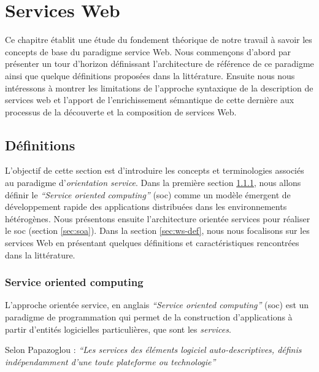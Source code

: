 \chapter{Services Web}
\label{ch:web-service}

Ce chapitre établit une étude du fondement théorique de notre travail
à savoir les concepts de base du paradigme service Web.  Nous
commençons d'abord par présenter un tour d'horizon définissant
l'architecture de référence de ce paradigme ainsi que quelque
définitions proposées dans la littérature. Ensuite nous nous
intéressons à montrer les limitations de l'approche syntaxique de la
description de services web et l'apport de l'enrichissement sémantique
de cette dernière aux processus de la découverte et la composition de
services Web.

\newpage
\section{Définitions}
\label{sec:ws-definitions}
L'objectif de cette section est d'introduire les concepts et
terminologies associés au paradigme d'\textit{orientation
  service}. Dans la première section \ref{sec:soc}, nous allons
définir le \textit{``Service oriented computing''} (\acrshort{soc})
comme un modèle émergent de développement rapide des applications
distribuées dans les environnements hétérogènes. Nous présentons
ensuite l'architecture orientée services pour réaliser le
\acrshort{soc} (section \ref{sec:soa}). Dans la section
\ref{sec:ws-def}, nous nous focalisons sur les services Web en
présentant quelques définitions et caractéristiques rencontrées dans
la littérature.

\subsection{Service oriented computing}
  \label{sec:soc}
  L'approche orientée service, en anglais \textit{``Service oriented
    computing''} (\acrshort{soc}) est un paradigme de programmation
  qui permet de la construction d'applications à partir d'entités
  logicielles particulières, que sont les \emph{services}.

  \bigskip

  Selon Papazoglou \cite{papazoglou2003service}: \textit{``Les
    services des éléments logiciel auto-descriptives, définis
    indépendamment d'une toute plateforme ou technologie''}

  \bigskip

